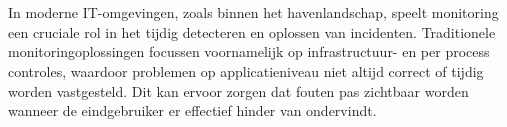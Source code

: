 
%
%
%
%
%

%



\chapter*{}


In moderne IT-omgevingen, zoals binnen het havenlandschap, speelt monitoring een cruciale rol in het tijdig detecteren en oplossen van incidenten. Traditionele monitoringoplossingen focussen voornamelijk op infrastructuur- en per process controles, waardoor problemen op applicatieniveau niet altijd correct of tijdig worden vastgesteld. Dit kan ervoor zorgen dat fouten pas zichtbaar worden wanneer de eindgebruiker er effectief hinder van ondervindt.

